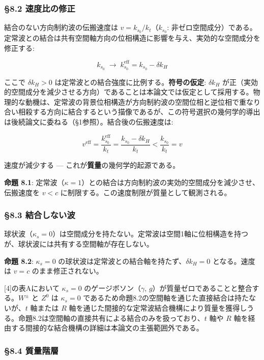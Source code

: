 \documentclass[
  a4paper,11pt]{ltjsarticle}
\theoremstyle{definition}
\theoremstyle{remark}
\begin{document}
\subsubsection{§8.2
速度比の修正}\label{ux901fux5ea6ux6bd4ux306eux4feeux6b63}

結合のない方向制約波の伝搬速度は \(v = k_{s_0} / k_t\)（\(k_{s_0}\):
非ゼロ空間成分）である。定常波との結合は共有空間軸方向の位相構造に影響を与え、実効的な空間成分を修正する:

\[k_{s_0} \;\longrightarrow\; k_{s_0}^{\text{eff}} = k_{s_0} - \delta k_H\]

ここで \(\delta k_H > 0\)
は定常波との結合強度に比例する。\textbf{符号の仮定}: \(\delta k_H\)
が正（実効的空間成分を減少させる方向）であることは本論文では仮定として採用する。物理的な動機は、定常波の背景位相構造が方向制約波の空間位相と逆位相で重なり合い相殺する方向に結合するという描像であるが、この符号選択の幾何学的導出は後続論文に委ねる（§1参照）。結合後の伝搬速度は:

\[v^{\text{eff}} = \frac{k_{s_0}^{\text{eff}}}{k_t} = \frac{k_{s_0} - \delta k_H}{k_t} < \frac{k_{s_0}}{k_t} = v\]

速度が減少する --- これが\textbf{質量}の幾何学的起源である。

\textbf{命題 8.1}:
定常波（\(\kappa = 1\)）との結合は方向制約波の実効的空間成分を減少させ、伝搬速度を
\(v < c\) に制限する。この速度制限が質量として観測される。

\subsubsection{§8.3
結合しない波}\label{ux7d50ux5408ux3057ux306aux3044ux6ce2}

球状波（\(\kappa_s = 0\)）は空間成分を持たない。定常波は空間1軸に位相構造を持つが、球状波には共有する空間軸が存在しない。

\textbf{命題 8.2}: \(\kappa_s = 0\)
の球状波は定常波との結合軸を持たず、\(\delta k_H = 0\) となる。速度は
\(v = c\) のまま修正されない。

{[}4{]}の表Aにおいて \(\kappa_s = 0\) のゲージボソン（\(\gamma\),
\(g\)）が質量ゼロであることと整合する。\(W^{\pm}\) と \(Z^0\) は
\(\kappa_s = 0\)
であるため命題8.2の空間軸を通じた直接結合は持たないが、\(t\) 軸または
\(R\)
軸を通じた間接的な定常波結合機構により質量を獲得しうる。命題8.2は空間軸の直接共有による結合のみを扱っており、\(t\)
軸や \(R\)
軸を経由する間接的な結合機構の詳細は本論文の主張範囲外である。

\subsubsection{§8.4 質量階層}\label{ux8ceaux91cfux968eux5c64}
\end{document}
